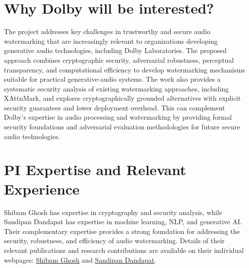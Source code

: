 \section{Why Dolby will be interested?}
The project addresses key challenges in trustworthy and secure audio watermarking that are increasingly relevant to organizations developing generative audio technologies, including Dolby Laboratories. The proposed approach combines cryptographic security, adversarial robustness, perceptual transparency, and computational efficiency to develop watermarking mechanisms suitable for practical generative-audio systems. The work also provides a systematic security analysis of existing watermarking approaches, including XAttnMark, and explores cryptographically grounded alternatives with explicit security guarantees and lower deployment overhead. This can complement Dolby’s expertise in audio processing and watermarking by providing formal security foundations and adversarial evaluation methodologies for future secure audio technologies.

\section{PI Expertise and Relevant Experience}
Shibam Ghosh has expertise in cryptography and security analysis, while Sandipan Dandapat has expertise in machine learning, NLP, and generative AI. Their complementary expertise provides a strong foundation for addressing the security, robustness, and efficiency of audio watermarking. Details of their relevant publications and research contributions are available on their individual webpages: \href{https://shibamcrs.github.io/}{Shibam Ghosh} and \href{https://people.iith.ac.in/sdandapat/index.html}{Sandipan Dandapat}. 

	
	
